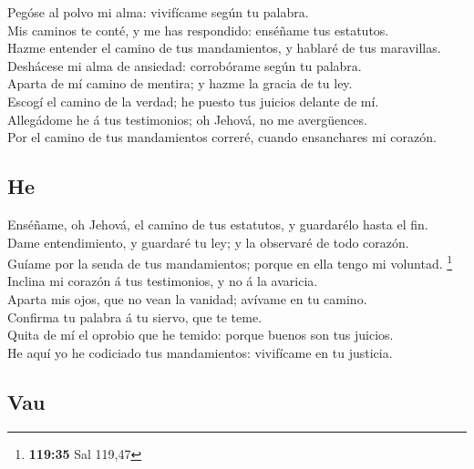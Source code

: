  Pegóse al polvo mi alma: vivifícame según tu palabra.\\
 Mis caminos te conté, y me has respondido: enséñame tus
estatutos.\\
 Hazme entender el camino de tus mandamientos, y hablaré de
tus maravillas.\\
 Deshácese mi alma de ansiedad: corrobórame según tu
palabra.\\
 Aparta de mí camino de mentira; y hazme la gracia de tu
ley.\\
 Escogí el camino de la verdad; he puesto tus juicios
delante de mí.\\
 Allegádome he á tus testimonios; oh Jehová, no me
avergüences.\\
 Por el camino de tus mandamientos correré, cuando
ensanchares mi corazón.

\hypertarget{he}{%
\subsection{He}\label{he}}

 Enséñame, oh Jehová, el camino de tus estatutos, y
guardarélo hasta el fin.\\
 Dame entendimiento, y guardaré tu ley; y la observaré de
todo corazón.\\
 Guíame por la senda de tus mandamientos; porque en ella
tengo mi voluntad. \footnote{\textbf{119:35} Sal 119,47}\\
 Inclina mi corazón á tus testimonios, y no á la
avaricia.\\
 Aparta mis ojos, que no vean la vanidad; avívame en tu
camino.\\
 Confirma tu palabra á tu siervo, que te teme.\\
 Quita de mí el oprobio que he temido: porque buenos son
tus juicios.\\
 He aquí yo he codiciado tus mandamientos: vivifícame en tu
justicia.

\hypertarget{vau}{%
\subsection{Vau}\label{vau}}

